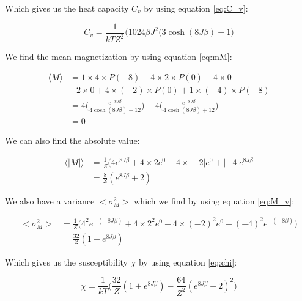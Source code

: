 \documentclass{article}
\begin{document}
Which gives us the heat capacity $C_v$ by using equation \ref{eq:C_v}:

\begin{equation}
C_v = \frac{1}{kTZ^2} \bigg(1024\beta J^2(3\cosh(8J\beta) + 1\bigg)
\label{eq:calc_Cv}
\end{equation}

We find the mean magnetization by using equation \ref{eq:mM}:

\begin{equation} \label{eq:calc_M}
\begin{split}
\langle M \rangle& = 1\times 4 \times P(-8) + 4 \times 2 \times P(0) + 4 \times 0 \\
& + 2\times0+4 \times (-2) \times P(0) +  1\times(-4) \times P(-8)\\
&=4\bigg(\frac{e^{-8J\beta }}{4\cosh{(8J\beta)}+12}\bigg)-4\bigg(\frac{e^{-8J\beta }}{4\cosh{(8J\beta)}+12}\bigg) \\
&=0
\end{split}
\end{equation}

We can also find the absolute value:

\begin{equation}
\begin{split}
\langle |M| \rangle &= \frac{1}{Z}\bigg(4e^{8J\beta}+4\times2e^0+4\times|-2|e^0+|-4|e^{8J\beta}\\
&=\frac{8}{Z}(e^{8J\beta}+2)
\label{eq:mean_calc_M}
\end{split}
\end{equation}


We also have a variance $<\sigma_M^2>$ which we find by using equation \ref{eq:M_v}:

\begin{equation}
\begin{split}
<\sigma_M^2>&=\frac{1}{Z}\bigg(4^2e^{-(-8J\beta)}+4\times 2^2e^0+4\times(-2)^2e^0+(-4)^2e^{-(-8\beta)}\bigg)\\
&=\frac{32}{Z}(1+e^{8J\beta})
\end{split}
\label{eq:calc_Mv}
\end{equation}

Which gives us the susceptibility $\chi$ by using equation \ref{eq:chi}:

\begin{equation}
\chi = \frac{1}{kT} \bigg(\frac{32}{Z}(1+e^{8J\beta})-\frac{64}{Z^2}(e^{8J\beta}+2)^2\bigg)
\label{eq:calc_chi}
\end{equation}
\end{document}
